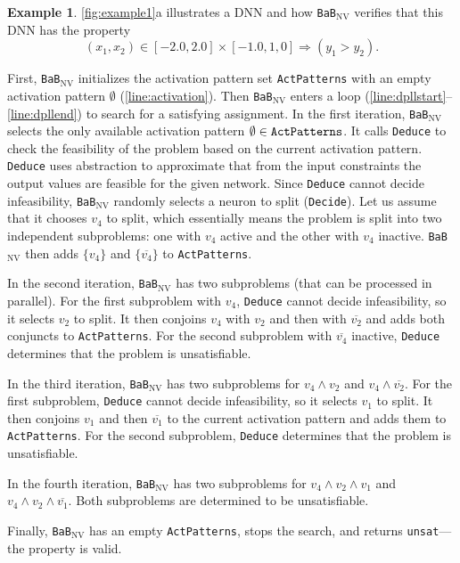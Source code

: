 \documentclass[oneside,11pt,dvipsnames]{book}
\numberwithin{equation}{section}
\theoremstyle{definition}
\newtheorem{example}{Example}[section]
\theoremstyle{remark}
\newcommand{\functiontextformat}[1]{\textrm{\texttt{#1}}}
\newcommand{\tvn}[1]{\iftoggle{usecomment}{{\color{red}{[TVN]: #1}}}{}}
\newcommand{\bab}{\texttt{BaB$_{\text{NV}}$}}
\newcommand{\unsat}{\texttt{unsat}}
\begin{document}
\begin{example} 
    
    \tvn{We should change this example to the 5-neuron DNN we have always been using.}\autoref{fig:example1}a illustrates a DNN and how \bab{} verifies that this DNN has the property 
\[
(x_1, x_2) \in [-2.0, 2.0] \times [-1.0, 1,0] \Rightarrow (y_1 > y_2).
\] 

First, \bab{} initializes the activation pattern set \functiontextformat{ActPatterns} with an empty activation pattern $\emptyset$ (\autoref{line:activation}). Then \bab{} enters a loop (\autoref{line:dpllstart}--\autoref{line:dpllend}) to search for a satisfying assignment. In the first iteration, \bab{} selects the only available activation pattern $\emptyset \in \functiontextformat{ActPatterns}$. 
It calls \functiontextformat{Deduce} to check the feasibility of the problem based on the current activation pattern. \functiontextformat{Deduce} uses abstraction to approximate that from the input constraints the output values are feasible for the given network. 
Since \functiontextformat{Deduce} cannot decide infeasibility, \bab{} randomly selects a neuron to split (\functiontextformat{Decide}). Let us assume that it chooses $v_4$ to split, which essentially means the problem is split into two independent subproblems: one with $v_4$ active and the other with $v_4$ inactive.
\bab{} then adds $\{v_4\}$ and $\{\overline{v_4}\}$ to \functiontextformat{ActPatterns}.

In the second iteration, \bab{} has two subproblems (that can be processed in parallel). For the first subproblem with $v_4$, \functiontextformat{Deduce} cannot decide infeasibility, so it selects $v_2$ to split. It then conjoins $v_4$ with $v_2$ and then with $\overline{v_2}$ and adds both conjuncts to \texttt{ActPatterns}. 
For the second subproblem with $\overline{v_4}$ inactive, \functiontextformat{Deduce} determines that the problem is unsatisfiable.

In the third iteration, \bab{} has two subproblems for $v_4 \land v_2$ and $v_4 \land \overline{v_2}$. For the first subproblem, \functiontextformat{Deduce} cannot decide infeasibility, so it selects $v_1$ to split. It then conjoins $v_1$ and then $\overline{v_1}$ to the current activation pattern and adds them to \functiontextformat{ActPatterns}. For the second subproblem, \functiontextformat{Deduce} determines that the problem is unsatisfiable.

In the fourth iteration, \bab{} has two subproblems for $v_4 \land v_2 \land v_1$ and $v_4 \land v_2 \land \overline{v_1}$. Both subproblems are determined to be unsatisfiable.

Finally, \bab{} has an empty \texttt{ActPatterns}, stops the search, and returns \unsat{}---the property is valid.

\end{example}
\end{document}
